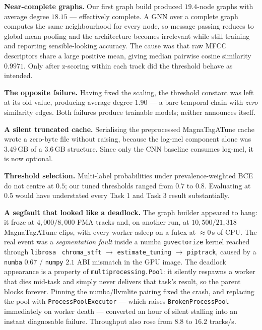 \documentclass[conference]{IEEEtran}
\begin{document}
\textbf{Near-complete graphs.} Our first graph build produced $19.4$-node
graphs with average degree $18.15$ --- effectively complete. A GNN over a
complete graph computes the same neighbourhood for every node, so message
passing reduces to global mean pooling and the architecture becomes
irrelevant while still training and reporting sensible-looking accuracy. The
cause was that raw MFCC descriptors share a large positive mean, giving median
pairwise cosine similarity $0.9971$. Only after z-scoring within each track did
the threshold behave as intended.

\textbf{The opposite failure.} Having fixed the scaling, the threshold constant
was left at its old value, producing average degree $1.90$ --- a bare temporal
chain with \emph{zero} similarity edges. Both failures produce trainable models;
neither announces itself.

\textbf{A silent truncated cache.} Serialising the preprocessed
MagnaTagATune cache wrote a zero-byte file without raising, because the
log-mel component alone was $3.49$\,GB of a $3.6$\,GB structure. Since only the
CNN baseline consumes log-mel, it is now optional.

\textbf{Threshold selection.} Multi-label probabilities under
prevalence-weighted BCE do not centre at $0.5$; our tuned thresholds ranged from
$0.7$ to $0.8$. Evaluating at $0.5$ would have understated every Task 1 and
Task 3 result substantially.

\textbf{A segfault that looked like a deadlock.} The graph builder appeared to
hang: it froze at $4{,}000/8{,}000$ FMA tracks and, on another run, at
$10{,}500/21{,}318$ MagnaTagATune clips, with every worker asleep on a futex at
$\approx0$\,s of CPU. The real event was a \emph{segmentation fault} inside a
numba \texttt{guvectorize} kernel reached through
\texttt{librosa}~\cite{librosa} \texttt{chroma\_stft} $\to$ \texttt{estimate\_tuning} $\to$
\texttt{piptrack}, caused by a \texttt{numba} $0.67$ / \texttt{numpy} $2.1$ ABI
mismatch in the GPU image. The deadlock appearance is a property of
\texttt{multiprocessing.Pool}: it silently respawns a worker that dies mid-task
and simply never delivers that task's result, so the parent blocks forever.
Pinning the numba/llvmlite pairing fixed the crash, and replacing the pool with
\texttt{ProcessPoolExecutor} --- which raises \texttt{BrokenProcessPool}
immediately on worker death --- converted an hour of silent stalling into an
instant diagnosable failure. Throughput also rose from $8.8$ to $16.2$
tracks/s.
\end{document}
